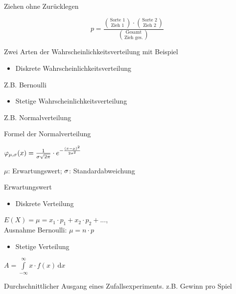 \begin{frage}Ziehen ohne Zurücklegen\end{frage}
\begin{antwort}\Large
	\[
	 p=\frac{\binom{\text{Sorte 1}}{\text{Zieh 1}} \cdot \binom{\text{Sorte 2}}{\text{Zieh 2}}}{\binom{\text{Gesamt}}{\text{Zieh ges.}}}
	 \]\end{antwort}
\begin{frage}Zwei Arten der Wahrscheinlichkeitsverteilung mit Beispiel\end{frage}
\begin{antwort}\begin{itemize}
		\item Diskrete Wahrscheinlichkeitsverteilung
	\end{itemize}
	Z.B. Bernoulli
	\begin{itemize}
		\item Stetige Wahrscheinlichkeitsverteilung
	\end{itemize}
	Z.B. Normalverteilung\end{antwort}
\begin{frage}Formel der Normalverteilung\end{frage}
\begin{antwort}\begin{center}
		\Large
		$\varphi_{\mu,\sigma}(x)=\frac{1}{\sigma\sqrt{2\pi}}\cdot e^{-\frac{(x-\mu)^2}{2\sigma^2}}$
		\vspace{1cm}
		
		\normalsize
		$\mu$: Erwartungswert; $\sigma$: Standardabweichung
	\end{center}\end{antwort}
\begin{frage}Erwartungswert\end{frage}
\begin{antwort}\begin{itemize}
		\item Diskrete Verteilung
	\end{itemize}
	$E(X)=\mu=x_1 \cdot p_1 + x_2 \cdot p_2 + ...$,\\
	Ausnahme Bernoulli: $\mu=n \cdot p$
	\begin{itemize}
		\item Stetige Verteilung
	\end{itemize}
	$A=\displaystyle\int\limits_{-\infty}^{\infty} \!x\cdot f(x) \, \mathrm{d}x$
	
	Durchschnittlicher Ausgang eines Zufallsexperiments.
	z.B. Gewinn pro Spiel\end{antwort}
